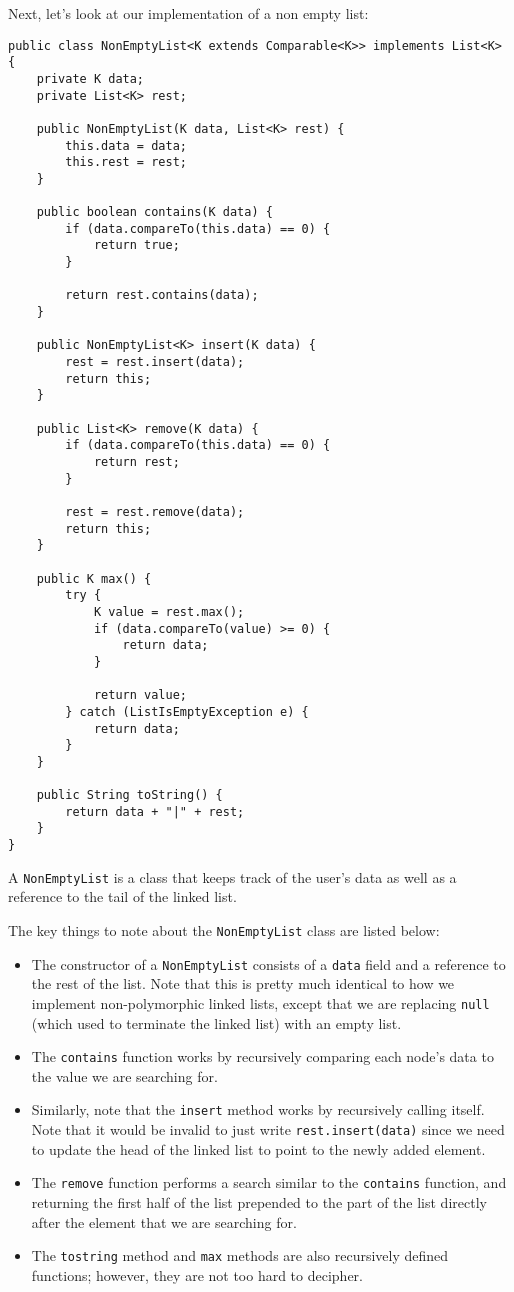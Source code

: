 Next, let's look at our implementation of a non empty list:

\begin{lstlisting}
public class NonEmptyList<K extends Comparable<K>> implements List<K> {
	private K data;
	private List<K> rest;
	
	public NonEmptyList(K data, List<K> rest) {
		this.data = data;
		this.rest = rest;
	}

	public boolean contains(K data) {
		if (data.compareTo(this.data) == 0) {
			return true;
		}
		
		return rest.contains(data);
	}

	public NonEmptyList<K> insert(K data) {
		rest = rest.insert(data);
		return this;
	}

	public List<K> remove(K data) {
		if (data.compareTo(this.data) == 0) {
			return rest;
		}
		 
		rest = rest.remove(data);
		return this;	
	}
	
	public K max() {
		try {
			K value = rest.max();
			if (data.compareTo(value) >= 0) {
				return data;
			}
			
			return value;
		} catch (ListIsEmptyException e) {
			return data;
		}
	}
	
	public String toString() {
		return data + "|" + rest;
	}
}
\end{lstlisting}

A \verb!NonEmptyList! is a class that keeps track of the user's data as well as a reference to the tail of the linked list.  

The key things to note about the \verb!NonEmptyList! class are listed below:

\begin{itemize}
    \item The constructor of a \verb!NonEmptyList! consists of a \verb!data! field and a reference to the rest of the list. Note that this is pretty much identical to how we implement non-polymorphic linked lists, except that we are replacing \verb!null! (which used to terminate the linked list) with an empty list.
    \item The \verb!contains! function works by recursively comparing each node's data to the value we are searching for.
    \item Similarly, note that the \verb!insert! method works by recursively calling itself. Note that it would be invalid to just write \verb!rest.insert(data)! since we need to update the head of the linked list to point to the newly added element. 
    \item The \verb!remove! function performs a search similar to the \verb!contains! function, and returning the first half of the list prepended to the part of the list directly after the element that we are searching for.
    \item The \verb!tostring! method and \verb!max! methods are also recursively defined functions; however, they are not too hard to decipher.
\end{itemize}